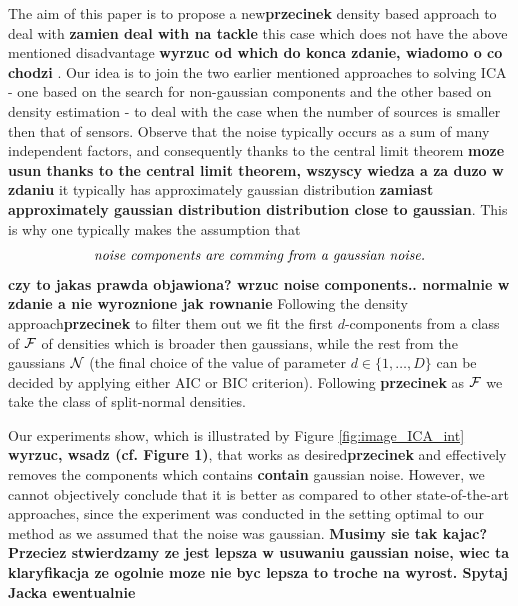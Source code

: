 The aim of this paper is to propose a new\textbf{przecinek} density based approach to deal with \textbf{zamien deal with na tackle} this case which does not have the above
mentioned disadvantage \textbf{wyrzuc od which do konca zdanie, wiadomo o co chodzi} . Our idea is to join the two earlier mentioned approaches to solving ICA - one based on the search for non-gaussian components and the
other based on density estimation - to deal with the case when the number of sources is smaller then that of sensors.  
Observe that the noise typically occurs as a sum of many independent
factors, and consequently thanks to the central limit theorem \textbf{moze usun thanks to the central limit theorem, wszyscy wiedza a za duzo w zdaniu} 
it typically has approximately gaussian distribution \textbf{zamiast approximately gaussian distribution distribution close to gaussian}. This is why
one typically makes the assumption \cite{cover2012elements} that
$$
\text{\em noise components are comming from a gaussian noise.}
$$ 
\textbf{czy to jakas prawda objawiona? wrzuc noise components.. normalnie w zdanie a nie wyroznione jak rownanie}
Following the density approach\textbf{przecinek} to filter them out we fit the first $d$-components from a class of $\mathcal{F}$ of densities which is broader then gaussians, while the rest from the gaussians $\mathcal{N}$ (the final choice of the value of parameter $d \in \{1,\ldots,D\}$ can be decided by applying either AIC or BIC criterion). Following \cite{ICA2017pattern}\textbf{przecinek} as $\mathcal{F}$ we take the class \SN{} of split-normal densities.

Our experiments show, which is illustrated by Figure \ref{fig:image_ICA_int} \textbf{wyrzuc, wsadz (cf. Figure 1)}, that \ICA{} works as desired\textbf{przecinek} and effectively removes the components which contains \textbf{contain} gaussian noise. However, we cannot objectively conclude that it is better as compared to other state-of-the-art approaches, since the experiment 
was conducted in the setting optimal to our method as we assumed
that the noise was gaussian. \textbf{Musimy sie tak kajac? Przeciez stwierdzamy ze jest lepsza w usuwaniu gaussian noise, wiec ta klaryfikacja ze ogolnie moze nie byc lepsza
to troche na wyrost. Spytaj Jacka ewentualnie}
